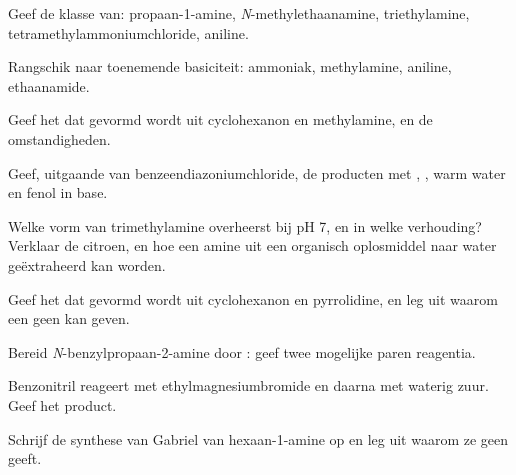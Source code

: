 \begin{exercise}[$\star$]\label{exo:b2:amines:1}
Geef de klasse van: propaan-1-amine, \textit{N}-methylethaanamine, triethylamine,
tetramethylammoniumchloride, aniline.
\end{exercise}

\begin{exercise}[$\star$]\label{exo:b2:amines:2}
Rangschik naar toenemende basiciteit: ammoniak, methylamine, aniline, ethaanamide.
\end{exercise}

\begin{exercise}[$\star$]\label{exo:b2:amines:3}
Geef het  dat gevormd wordt uit cyclohexanon en methylamine, en de omstandigheden.
\end{exercise}

\begin{exercise}[$\star$]\label{exo:b2:amines:4}
Geef, uitgaande van benzeendiazoniumchloride, de producten met , , warm water
en fenol in base.
\end{exercise}

\begin{exercise}[$\star\star$]\label{exo:b2:amines:5}
Welke vorm van trimethylamine overheerst bij pH 7, en in welke verhouding? Verklaar de citroen, en hoe een
amine uit een organisch oplosmiddel naar water geëxtraheerd kan worden.
\end{exercise}

\begin{exercise}[$\star\star$]\label{exo:b2:amines:6}
Geef het  dat gevormd wordt uit cyclohexanon en pyrrolidine, en leg uit waarom een 
geen  kan geven.
\end{exercise}

\begin{exercise}[$\star\star$]\label{exo:b2:amines:7}
Bereid \textit{N}-benzylpropaan-2-amine  door : geef twee
mogelijke paren reagentia.
\end{exercise}

\begin{exercise}[$\star\star$]\label{exo:b2:amines:8}
Benzonitril reageert met ethylmagnesiumbromide en daarna met waterig zuur. Geef het product.
\end{exercise}

\begin{exercise}[$\star\star$]\label{exo:b2:amines:9}
Schrijf de synthese van Gabriel van hexaan-1-amine op en leg uit waarom ze geen  geeft.
\end{exercise}

